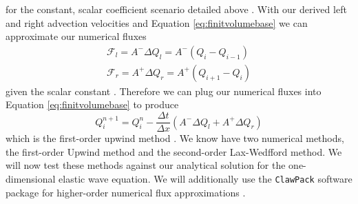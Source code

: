 \documentclass[review,onefignum,onetabnum]{siamart171218}
\begin{document}
for the constant, scalar coefficient scenario detailed above \cite{comp_seis}. With our derived left and right advection velocities and Equation \ref{eq:finitvolumebase} we can approximate our numerical fluxes 
\begin{equation}
    \begin{gathered}
        \mathcal{F}_l = A^{-} \Delta Q_l = A^{-} ( Q_i - Q_{i-1} ) \\
        \mathcal{F}_r = A^{+} \Delta Q_r = A^{+} ( Q_{i+1} - Q_{i} )
    \end{gathered}
\end{equation}
given the scalar constant \cite{comp_seis}. Therefore we can plug our numerical fluxes into Equation \ref{eq:finitvolumebase} to produce 
\begin{equation}
    Q^{n+1}_i = Q^n_i - \frac{\Delta t}{\Delta x} (A^{-} \Delta Q_l + A^{+} \Delta Q_r) 
\end{equation}
which is the first-order upwind method \cite{comp_seis,leveque_2002}. We know have two numerical methods, the first-order Upwind method and the second-order Lax-Wedfford method. We will now test these methods against our analytical solution for the one-dimensional elastic wave equation. We will additionally use the \texttt{ClawPack} software package for higher-order numerical flux approximations \cite{clawpack}. 
\end{document}
